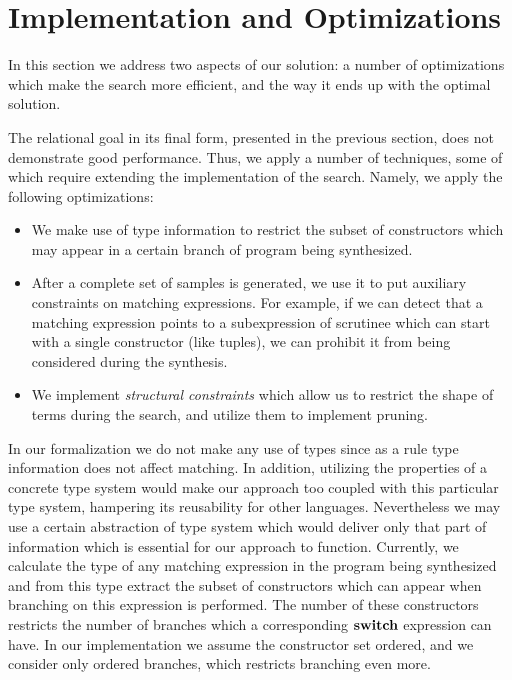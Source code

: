 \section{Implementation and Optimizations}
\label{sec:optimization}

In this section we address two aspects of our solution: a number of optimizations which make the search more efficient, and
the way it ends up with the optimal solution.

The relational goal in its final form, presented in the previous section, does not demonstrate good performance. Thus, we apply a number
of techniques, some of which require extending the implementation of the search. Namely, we apply the following optimizations:

\begin{itemize}
\item We make use of type information to restrict the subset of constructors which may appear in a certain branch of
  program being synthesized.
\item After a complete set of samples is generated, we use it to put auxiliary constraints on matching expressions. For example,
  if we can detect that a matching expression points to a subexpression of scrutinee which can start with a single constructor (like
  tuples), we can prohibit it from being considered during the synthesis.
\item We implement \emph{structural constraints} which allow us to restrict the shape of terms during the search, and
  utilize them to implement pruning.
\end{itemize}

In our formalization we do not make any use of types since as a rule type information does not affect matching. In addition,
utilizing the properties of a concrete type system would make our approach too coupled with this particular type system, hampering
its reusability for other languages. Nevertheless we may use a certain abstraction of type system which would deliver only
that part of information which is essential for our approach to function. Currently, we calculate the type of any matching expression in
the program being synthesized and from this type extract the subset of constructors which can appear when branching on this expression
is performed. The number of these constructors restricts the number of branches which a corresponding $\mathbf{switch}$ expression can have.
In our implementation we assume the constructor set ordered, and we consider only ordered branches, which restricts branching even more.

